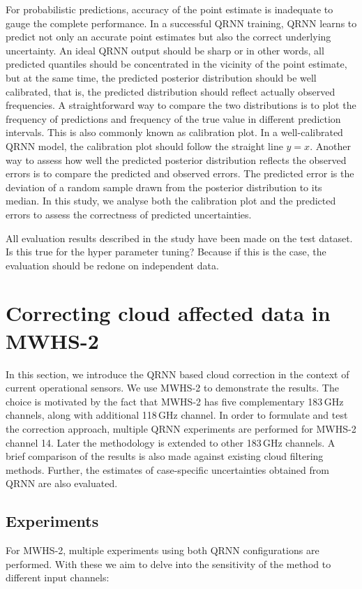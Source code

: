 \documentclass[amt, manuscript]{copernicus}
\newcommand{\todo}[1]{{\color{red} #1}}
\begin{document}
For probabilistic predictions, accuracy of the point estimate is inadequate to
gauge the complete performance. In a successful QRNN training, QRNN learns to
predict not only an accurate point estimates but also the correct underlying
uncertainty. An ideal QRNN output should be sharp or in other words, all
predicted quantiles should be concentrated in the vicinity of the point
estimate, but at the same time, the predicted posterior distribution should be
well calibrated, that is, the predicted distribution should reflect actually
observed frequencies. A straightforward way to compare the two distributions is
to plot the frequency of predictions and frequency of the true value in
different prediction intervals. This is also commonly known as calibration plot.
In a well-calibrated QRNN model, the calibration plot should follow the straight
line $y = x$. Another way to assess how well the predicted posterior distribution
reflects the observed errors is to compare the predicted and observed errors.
The predicted error is the deviation of a random sample drawn from the posterior
distribution to its median. In this study, we analyse both the calibration plot
and the predicted errors to assess the correctness of predicted uncertainties.

All evaluation results described in the study have been made on the test dataset.
\todo{Is this true for the hyper parameter tuning? Because if this is the
  case, the evaluation should be redone on independent data.}


\section{Correcting cloud affected data in MWHS-2}
\label{qrnn_mwhs}
%
In this section, we introduce the QRNN based cloud correction in the context of current operational sensors.  We use MWHS-2 to demonstrate the results. The choice is motivated by the fact that MWHS-2 has five complementary 183\,GHz channels, along with additional 118\,GHz channel. In order to formulate and test the correction approach, multiple QRNN experiments are performed for MWHS-2 channel 14. Later the methodology is extended to other 183\,GHz channels. A brief comparison of the results is also made against existing cloud filtering methods. Further, the estimates of case-specific uncertainties obtained from QRNN are also evaluated.

\subsection{Experiments}
%
\label{sec:QRNN_expt_MWHS}
For MWHS-2, multiple experiments using both QRNN configurations are performed. With these we aim to delve into the sensitivity of the method to different input channels:
\end{document}
